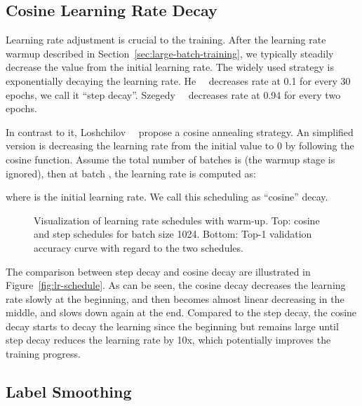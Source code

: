 \documentclass[10pt,twocolumn,letterpaper]{article}
\begin{document}
\subsection{Cosine Learning Rate Decay}

Learning rate adjustment is crucial to the training. After the learning
rate warmup described in Section~\ref{sec:large-batch-training}, we typically
steadily decrease the value from the initial learning rate. The widely used
strategy is exponentially decaying the learning rate. He~\etal~\cite{he2016deep} decreases rate at 0.1
for every 30 epochs, we call it ``step decay''.
Szegedy~\etal~\cite{DBLP:journals/corr/SzegedyVISW15} decreases rate at 0.94 for every two epochs.

In contrast to it, Loshchilov~\etal~\cite{DBLP:journals/corr/LoshchilovH16a} propose a cosine
annealing strategy. An simplified version is decreasing the learning rate from
the initial value to 0 by following the cosine function. Assume the total number
of batches is  (the warmup stage is ignored), then at batch , the learning
rate  is computed as:

where  is the initial learning rate. We call this scheduling as ``cosine''
decay.


\begin{figure}[t!]
  \centering
  \vfill {}\caption{Visualization of learning rate schedules with warm-up. Top: cosine and step schedules for batch size 1024. Bottom: Top-1 validation accuracy curve with regard to the two schedules.}
  \label{fig:learning-rate-curve}
\end{figure}

The comparison between step decay and cosine decay are illustrated in
Figure~\ref{fig:lr-schedule}. As can be seen, the cosine decay decreases the
learning rate slowly at the beginning, and then becomes almost linear decreasing
in the middle, and slows down again at the end. Compared to the step decay, the
cosine decay starts to decay the learning since the beginning but remains 
large until step decay reduces the learning rate by 10x, which
potentially improves the training progress.

\subsection{Label Smoothing}
\end{document}
